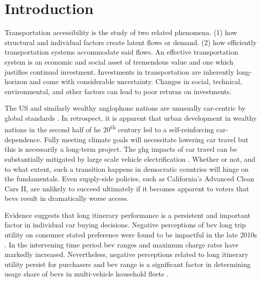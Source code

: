 \section*{Introduction}

Transportation accessibility is the study of two related phenomena. (1) how structural and individual factors create latent flows or demand. (2) how efficiently transportation systems accommodate said flows. An effective transportation system is an economic and social asset of tremendous value and one which justifies continual investment. Investments in transportation are inherently long-horizon and come with considerable uncertainty. Changes in social, technical, environmental, and other factors can lead to poor returns on investments.

The US and similarly wealthy anglophone nations are unusually car-centric by global standards \cite{PrietoCuriel_2024}. In retrospect, it is apparent that urban development in wealthy nations in the second half of he 20\textsuperscript{th} century led to a self-reinforcing car-dependence. Fully meeting climate goals will necessitate lowering car travel \cite{Milovanoff_2020} but this is necessarily a long-term project. The \gls{ghg} impacts of car travel can be substantially mitigated by large scale vehicle electrification \cite{NA_2021}. Whether or not, and to what extent, such a transition happens in democratic countries will hinge on the fundamentals. Even supply-side policies, such as California's Advanced Clean Cars II, are unlikely to succeed ultimately if it becomes apparent to voters that \glspl{bev} result in dramatically worse access.

Evidence suggests that long itinerary performance is a persistent and important factor in individual car buying decisions. Negative perceptions of \gls{bev} long trip utility on consumer stated preference were found to be impactful in the late 2010s \cite{Skippon_2016, Hardman_2016, Franke_2017, Schmalfuss_2017}. In the intervening time period \gls{bev} ranges and maximum charge rates have markedly increased. Nevertheless, negative perceptions related to long itinerary utility persist for purchasers \cite{Bhat_2022, Paradies_2023, Corradi_2023, Philip_2023} and \gls{bev} range is a significant factor in determining usage share of \glspl{bev} in multi-vehicle household fleets \cite{Chakraborty_2022}.

